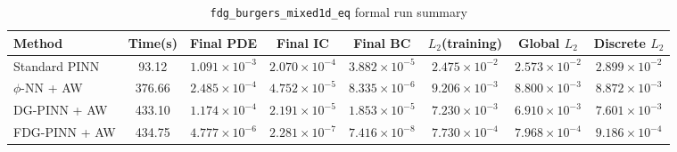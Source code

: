 \begin{table}[h]
\centering
\caption{\texttt{fdg\_burgers\_mixed1d\_eq} formal run summary}
\begin{adjustbox}{max width=\textwidth}
\scriptsize
\begin{tabular}{lccccccc}
\toprule
Method & Time(s) & Final PDE & Final IC & Final BC & $L_2$(training) & Global $L_2$ & Discrete $L_2$ \\
\midrule
Standard PINN & 93.12 & $1.091\times10^{-3}$ & $2.070\times10^{-4}$ & $3.882\times10^{-5}$ & $2.475\times10^{-2}$ & $2.573\times10^{-2}$ & $2.899\times10^{-2}$ \\
$\phi$-NN + AW & 376.66 & $2.485\times10^{-4}$ & $4.752\times10^{-5}$ & $8.335\times10^{-6}$ & $9.206\times10^{-3}$ & $8.800\times10^{-3}$ & $8.872\times10^{-3}$ \\
DG-PINN + AW & 433.10 & $1.174\times10^{-4}$ & $2.191\times10^{-5}$ & $1.853\times10^{-5}$ & $7.230\times10^{-3}$ & $6.910\times10^{-3}$ & $7.601\times10^{-3}$ \\
FDG-PINN + AW & 434.75 & $4.777\times10^{-6}$ & $2.281\times10^{-7}$ & $7.416\times10^{-8}$ & $7.730\times10^{-4}$ & $7.968\times10^{-4}$ & $9.186\times10^{-4}$ \\
\bottomrule
\end{tabular}
\end{adjustbox}
\end{table}
